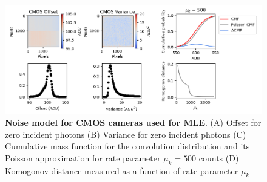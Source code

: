 \documentclass{ucetd}
\begin{document}

\begin{figure}
\begin{center}
\includegraphics[width=16cm]{Noise.png}
\end{center}
\caption{\textbf{Noise model for CMOS cameras used for MLE}. (A) Offset for zero incident photons (B) Variance for zero incident photons (C) Cumulative mass function for the convolution distribution and its Poisson approximation for rate parameter $\mu_{k} = 500$ counts (D) Komogonov distance measured as a function of rate parameter $\mu_{k}$}
\end{figure}
\end{document}
